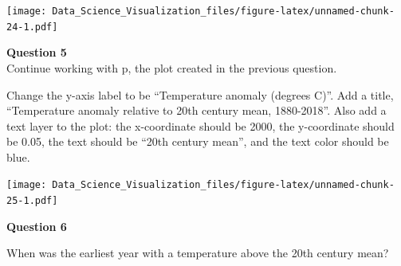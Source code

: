 \documentclass[
]{article}
\newenvironment{Shaded}{\begin{snugshade}}{\end{snugshade}}
\newcommand{\DataTypeTok}[1]{\textcolor[rgb]{0.13,0.29,0.53}{#1}}
\newcommand{\DecValTok}[1]{\textcolor[rgb]{0.00,0.00,0.81}{#1}}
\newcommand{\FloatTok}[1]{\textcolor[rgb]{0.00,0.00,0.81}{#1}}
\newcommand{\KeywordTok}[1]{\textcolor[rgb]{0.13,0.29,0.53}{\textbf{#1}}}
\newcommand{\NormalTok}[1]{#1}
\newcommand{\OperatorTok}[1]{\textcolor[rgb]{0.81,0.36,0.00}{\textbf{#1}}}
\newcommand{\StringTok}[1]{\textcolor[rgb]{0.31,0.60,0.02}{#1}}
\begin{document}
\texttt{[image: Data\_Science\_Visualization\_files/figure-latex/unnamed-chunk-24-1.pdf]}

\textbf{Question 5}\\
Continue working with p, the plot created in the previous question.

Change the y-axis label to be ``Temperature anomaly (degrees C)''. Add a
title, ``Temperature anomaly relative to 20th century mean, 1880-2018''.
Also add a text layer to the plot: the x-coordinate should be 2000, the
y-coordinate should be 0.05, the text should be ``20th century mean'',
and the text color should be blue.

\begin{Shaded}
\end{Shaded}

\texttt{[image: Data\_Science\_Visualization\_files/figure-latex/unnamed-chunk-25-1.pdf]}

\textbf{Question 6}

When was the earliest year with a temperature above the 20th century
mean?

\begin{Shaded}
\end{Shaded}
\end{document}
